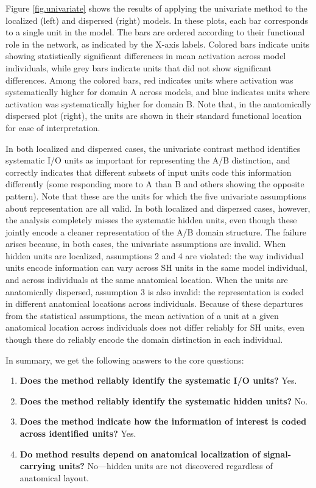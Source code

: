 Figure \ref{fig.univariate} shows the results of applying the univariate method to the localized (left) and dispersed (right) models. In these plots, each bar corresponds to a single unit in the model. The bars are ordered according to their functional role in the network, as indicated by the X-axis labels. Colored bars indicate units showing statistically significant differences in mean activation across model individuals, while grey bars indicate units that did not show significant differences. Among the colored bars, red indicates units where activation was systematically higher for domain A across models, and blue indicates units where activation was systematically higher for domain B. Note that, in the anatomically dispersed plot (right), the units are shown in their standard functional location for ease of interpretation.

In both localized and dispersed cases, the univariate contrast method identifies systematic I/O units as important for representing the A/B distinction, and correctly indicates that different subsets of input units code this information differently (some responding more to A than B and others showing the opposite pattern). Note that these are the units for which the five univariate assumptions about representation are all valid. In both localized and dispersed cases, however, the analysis completely misses the systematic hidden units, even though these jointly encode a cleaner representation of the A/B domain structure. The failure arises because, in both cases, the univariate assumptions are invalid. When hidden units are localized, assumptions 2 and 4 are violated: the way individual units encode information can vary across SH units in the same model individual, and across individuals at the same anatomical location. When the units are anatomically dispersed, assumption 3 is also invalid: the representation is coded in different anatomical locations across individuals. Because of these departures from the statistical assumptions, the mean activation of a unit at a given anatomical location across individuals does not differ reliably for SH units, even though these do reliably encode the domain distinction in each individual.

In summary, we get the following answers to the core questions:

\begin{enumerate}
\item {\bf Does the method reliably identify the systematic I/O units?} Yes.
\item {\bf Does the method reliably identify the systematic hidden units?} No.
\item {\bf Does the method indicate how the information of interest is coded across identified units?} Yes.
\item {\bf Do method results depend on anatomical localization of signal-carrying units?} No---hidden units are not discovered regardless of anatomical layout.
\end{enumerate}

